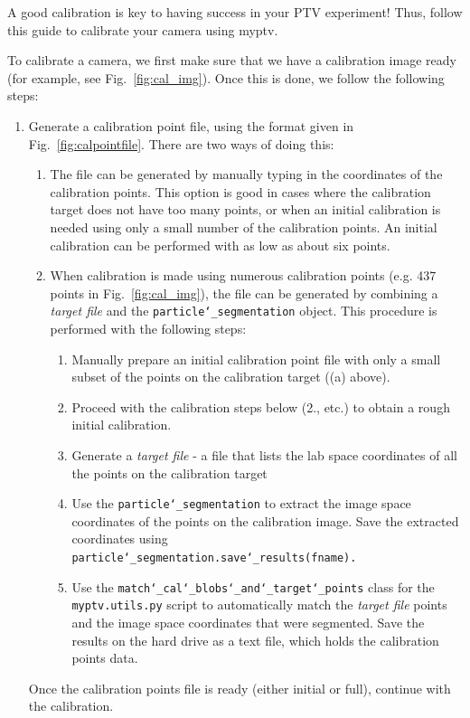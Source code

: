 \documentclass[10pt,a4paper]{article}
\begin{document}
A good calibration is key to having success in your PTV experiment! Thus, follow this guide to calibrate your camera using myptv.

To calibrate a camera, we first make sure that we have a calibration image ready (for example, see Fig.~\ref{fig:cal_img}). Once this is done, we follow the following steps:

\begin{enumerate}
	\item Generate a calibration point file, using the format given in Fig.~\ref{fig:calpointfile}. There are two ways of doing this: 
	\begin{enumerate}
		\item The file can be generated by manually typing in the coordinates of the calibration points. This option is good in cases where the calibration target does not have too many points, or when an initial calibration is needed using only a small number of the calibration points. An initial calibration can be performed with as low as about six points.
		
		\item When calibration is made using numerous calibration points (e.g. 437 points in Fig.~\ref{fig:cal_img}), the file can be generated by combining a \textit{target file} and the \texttt{particle\char`_segmentation} object. This procedure is performed with the following steps:
		
		\begin{enumerate}
			\item Manually prepare an initial calibration point file with only a small subset of the points on the calibration target ((a) above).
			\item Proceed with the calibration steps below (2., etc.) to obtain a rough initial calibration.
			\item Generate a \textit{target file} - a file that lists the lab space coordinates of all the points on the calibration target
			\item Use the \texttt{particle\char`_segmentation} to extract the image space coordinates of the points on the calibration image. Save the extracted coordinates using\\ \texttt{particle\char`_segmentation.save\char`_results(fname).}
			\item Use the \texttt{match\char`_cal\char`_blobs\char`_and\char`_target\char`_points} class for the \texttt{myptv.utils.py} script to automatically match the \textit{target file} points and the image space coordinates that were segmented. Save the results on the hard drive as a text file, which holds the calibration points data.
		\end{enumerate}
	\end{enumerate}
	Once the calibration points file is ready (either initial or full), continue with the calibration.
	

\end{enumerate}
\end{document}
